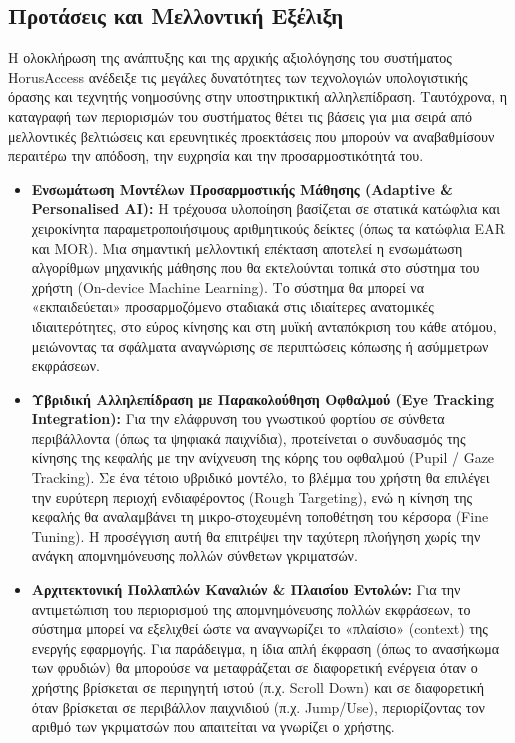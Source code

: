 \documentclass[twoside, a4paper, 11pt]{article}
\begin{document}
\subsection{Προτάσεις και Μελλοντική Εξέλιξη}

Η ολοκλήρωση της ανάπτυξης και της αρχικής αξιολόγησης του συστήματος HorusAccess ανέδειξε τις μεγάλες δυνατότητες των τεχνολογιών υπολογιστικής όρασης και τεχνητής νοημοσύνης στην υποστηρικτική αλληλεπίδραση. Ταυτόχρονα, η καταγραφή των περιορισμών του συστήματος θέτει τις βάσεις για μια σειρά από μελλοντικές βελτιώσεις και ερευνητικές προεκτάσεις που μπορούν να αναβαθμίσουν περαιτέρω την απόδοση, την ευχρησία και την προσαρμοστικότητά του.

\begin{itemize}
    \item \textbf{Ενσωμάτωση Μοντέλων Προσαρμοστικής Μάθησης (Adaptive \& Personalised AI):} Η τρέχουσα υλοποίηση βασίζεται σε στατικά κατώφλια και χειροκίνητα παραμετροποιήσιμους αριθμητικούς δείκτες (όπως τα κατώφλια EAR και MOR). Μια σημαντική μελλοντική επέκταση αποτελεί η ενσωμάτωση αλγορίθμων μηχανικής μάθησης που θα εκτελούνται τοπικά στο σύστημα του χρήστη (On-device Machine Learning). Το σύστημα θα μπορεί να «εκπαιδεύεται» προσαρμοζόμενο σταδιακά στις ιδιαίτερες ανατομικές ιδιαιτερότητες, στο εύρος κίνησης και στη μυϊκή ανταπόκριση του κάθε ατόμου, μειώνοντας τα σφάλματα αναγνώρισης σε περιπτώσεις κόπωσης ή ασύμμετρων εκφράσεων.

    \item \textbf{Υβριδική Αλληλεπίδραση με Παρακολούθηση Οφθαλμού (Eye Tracking Integration):} Για την ελάφρυνση του γνωστικού φορτίου σε σύνθετα περιβάλλοντα (όπως τα ψηφιακά παιχνίδια), προτείνεται ο συνδυασμός της κίνησης της κεφαλής με την ανίχνευση της κόρης του οφθαλμού (Pupil / Gaze Tracking). Σε ένα τέτοιο υβριδικό μοντέλο, το βλέμμα του χρήστη θα επιλέγει την ευρύτερη περιοχή ενδιαφέροντος (Rough Targeting), ενώ η κίνηση της κεφαλής θα αναλαμβάνει τη μικρο-στοχευμένη τοποθέτηση του κέρσορα (Fine Tuning). Η προσέγγιση αυτή θα επιτρέψει την ταχύτερη πλοήγηση χωρίς την ανάγκη απομνημόνευσης πολλών σύνθετων γκριματσών.

    \item \textbf{Αρχιτεκτονική Πολλαπλών Καναλιών \& Πλαισίου Εντολών:} Για την αντιμετώπιση του περιορισμού της απομνημόνευσης πολλών εκφράσεων, το σύστημα μπορεί να εξελιχθεί ώστε να αναγνωρίζει το «πλαίσιο» (context) της ενεργής εφαρμογής. Για παράδειγμα, η ίδια απλή έκφραση (όπως το ανασήκωμα των φρυδιών) θα μπορούσε να μεταφράζεται σε διαφορετική ενέργεια όταν ο χρήστης βρίσκεται σε περιηγητή ιστού (π.χ. Scroll Down) και σε διαφορετική όταν βρίσκεται σε περιβάλλον παιχνιδιού (π.χ. Jump/Use), περιορίζοντας τον αριθμό των γκριματσών που απαιτείται να γνωρίζει ο χρήστης.


\end{itemize}
\end{document}
